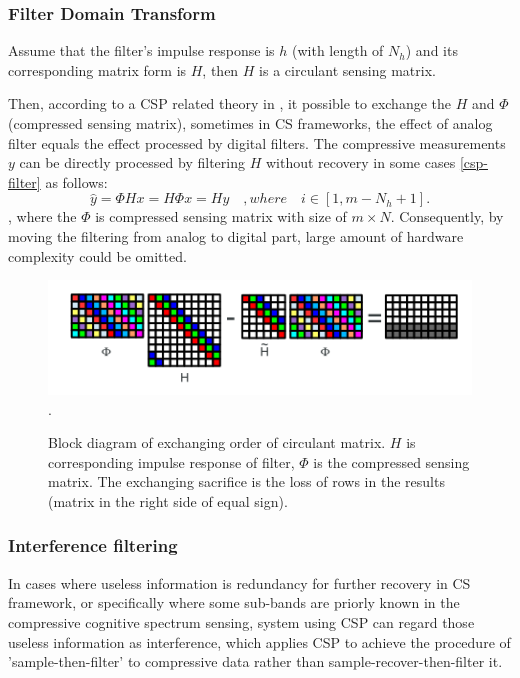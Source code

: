 \subsubsection{Filter Domain Transform}

Assume that the filter's impulse response is $h$ (with length of $N_h$) and its corresponding matrix form is $H$, then $H$ is a circulant sensing matrix. 

Then, according to a CSP related theory in \cite{valsesia2014compressive}, it possible to exchange the $H$ and $\Phi$ (compressed sensing matrix), sometimes in CS frameworks, the effect of analog filter equals the effect processed by digital filters. The compressive measurements $y$ can be directly processed by filtering $H$ without recovery in some cases \ref{csp-filter} as follows:  
\begin{equation}
\label{csp-filter}
\hat y = \Phi H x = H \Phi x = H y \quad, where \quad i \in [1,m-N_h+1].
\end{equation}
, where the $\Phi$ is compressed sensing matrix with size of $m \times N$.  Consequently, by moving the filtering from analog to digital part, large amount of hardware complexity could be omitted. 

\begin{figure}[!t]
\centering
\includegraphics[width=0.75\columnwidth]{figs/csp-filter-thm.png}
\DeclareGraphicsExtensions.
\caption{Block diagram of exchanging order of circulant matrix. $H$ is corresponding impulse response of filter, $\Phi$ is the compressed sensing matrix. The exchanging sacrifice is the loss of rows in the results (matrix in the right side of equal sign).}\label{csp-filter-thm}
\end{figure}

\subsubsection{Interference filtering}

In cases where useless information is redundancy for further recovery in CS framework, or specifically where some sub-bands are priorly known in the compressive cognitive spectrum sensing, system using CSP can regard those useless information as interference, which applies CSP to achieve the procedure of 'sample-then-filter' to compressive data rather than sample-recover-then-filter it. 

